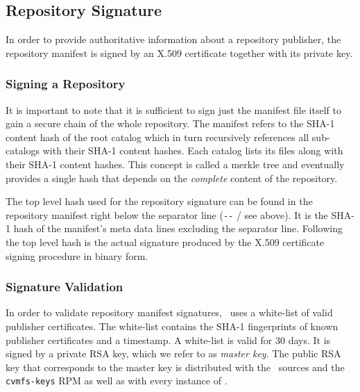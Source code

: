 \subsection{Repository Signature}
\label{sct:cvmfspublished:signature}
In order to provide authoritative information about a repository publisher, the repository manifest is signed by an X.509 certificate together with its private key.

\subsubsection{Signing a Repository}
It is important to note that it is sufficient to sign just the manifest file itself to gain a secure chain of the whole repository.
The manifest refers to the SHA-1 content hash of the root catalog which in turn recursively references all sub-catalogs with their SHA-1 content hashes.
Each catalog lists its files along with their SHA-1 content hashes.
This concept is called a merkle tree and eventually provides a single hash that depends on the \textit{complete} content of the repository.

The top level hash used for the repository signature can be found in the repository manifest right below the separator line (\texttt{-{}-} / see above).
It is the SHA-1 hash of the manifest's meta data lines excluding the separator line.
Following the top level hash is the actual signature produced by the X.509 certificate signing procedure in binary form.

\subsubsection{Signature Validation}
In order to validate repository manifest signatures, \cvmfs\ uses a white-list of valid publisher certificates.
The white-list contains the SHA-1 fingerprints of known publisher certificates and a timestamp.
A white-list is valid for 30 days.
It is signed by a private RSA key, which we refer to as \emph{master key}.
The public RSA key that corresponds to the master key is distributed with the \cvmfs\ sources and the \texttt{cvmfs-keys} RPM as well as with every instance of \cernvm.

